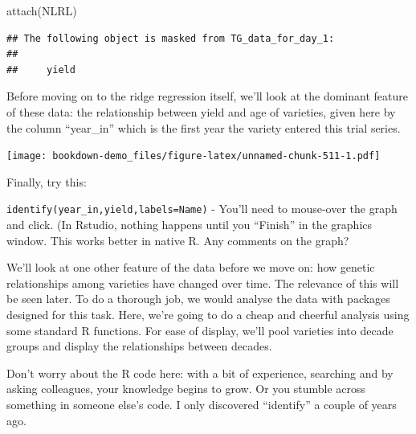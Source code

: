 \documentclass[
]{book}
\newenvironment{Shaded}{\begin{snugshade}}{\end{snugshade}}
\newcommand{\CommentTok}[1]{\textcolor[rgb]{0.56,0.35,0.01}{\textit{#1}}}
\newcommand{\FunctionTok}[1]{\textcolor[rgb]{0.00,0.00,0.00}{#1}}
\newcommand{\NormalTok}[1]{#1}
\newcommand{\SpecialCharTok}[1]{\textcolor[rgb]{0.00,0.00,0.00}{#1}}
\begin{document}
\begin{Shaded}
\begin{Highlighting}[]
\FunctionTok{attach}\NormalTok{(NLRL)}
\end{Highlighting}
\end{Shaded}

\begin{verbatim}
## The following object is masked from TG_data_for_day_1:
## 
##     yield
\end{verbatim}

Before moving on to the ridge regression itself, we'll look at the dominant feature of these data: the relationship between yield and age of varieties, given here by the column ``year\_in'' which is the first year the variety entered this trial series.

\begin{Shaded}
\end{Shaded}

\texttt{[image: bookdown-demo\_files/figure-latex/unnamed-chunk-511-1.pdf]}

Finally, try this:

\texttt{identify(year\_in,yield,labels=Name)} - You'll need to mouse-over the graph and click. (In Rstudio, nothing happens until you ``Finish'' in the graphics window. This works better in native R. Any comments on the graph?

We'll look at one other feature of the data before we move on: how genetic relationships
among varieties have changed over time. The relevance of this will be seen later. To do a thorough job, we would analyse the data with packages designed for this task. Here, we're going to do a cheap and cheerful analysis using some standard R functions. For ease of
display, we'll pool varieties into decade groups and display the relationships between
decades.

Don't worry about the R code here: with a bit of experience, searching and by asking
colleagues, your knowledge begins to grow. Or you stumble across something in someone else's code. I only discovered ``identify'' a couple of years ago.
\end{document}

